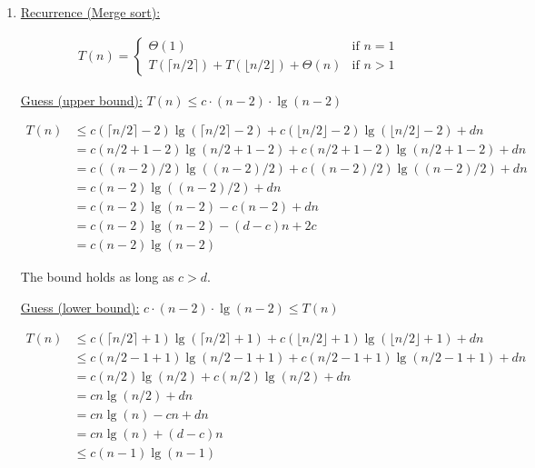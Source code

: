 \documentclass[12pt]{article}
\begin{document}
\begin{enumerate}[1.]
    \item
    \setcounter{equation}{0}
    \underline{Recurrence (Merge sort):}

    \begin{align*}
        T(n) =
        \begin{cases}
          \Theta(1) & \text{if $n = 1$}\\
          T(\lceil n/2 \rceil) + T(\lfloor n/2 \rfloor) + \Theta(n) & \text{if $n > 1$}
        \end{cases}
    \end{align*}

    \bigskip

    \underline{Guess (upper bound):} $T(n) \leq c \cdot (n-2) \cdot \lg (n-2)$

    \bigskip

    \begin{align}
        T(n) &\leq c(\lceil n/2 \rceil - 2) \lg (\lceil n/2 \rceil - 2) + c (\lfloor n/2 \rfloor - 2)\lg(\lfloor n/2 \rfloor - 2) + dn\\
        &= c(n/2 + 1 - 2) \lg (n/2 + 1 - 2) + c (n/2 + 1 - 2)\lg(n/2 + 1 - 2) + dn\\
        &= c((n-2)/2) \lg ((n-2)/2) + c ((n-2)/2)\lg((n-2)/2) + dn\\
        &= c(n-2) \lg ((n-2)/2) + dn\\
        &= c(n-2) \lg (n-2) - c(n-2) + dn\\
        &= c(n-2) \lg (n-2) - (d - c)n + 2c\\
        &= c(n-2) \lg (n-2)
    \end{align}

    \bigskip

    The bound holds as long as $c > d$.

    \bigskip

    \underline{Guess (lower bound):} $c \cdot (n-2) \cdot \lg (n-2) \leq T(n)$


    \bigskip

    \begin{align}
        T(n) &\leq c(\lceil n/2 \rceil + 1) \lg (\lceil n/2 \rceil + 1) + c (\lfloor n/2 \rfloor + 1)\lg(\lfloor n/2 \rfloor + 1) + dn\\
        &\leq c(n/2 - 1 + 1) \lg (n/2 - 1 + 1) + c (n/2 - 1 + 1)\lg(n/2 - 1 + 1) + dn\\
        &= c(n/2) \lg (n/2) + c (n/2)\lg(n/2) + dn\\
        &= cn \lg(n/2) + dn\\
        &= cn \lg(n) - cn + dn\\
        &= cn \lg(n) + (d - c)n\\
        &\leq c(n-1) \lg(n-1)
    \end{align}


\end{enumerate}
\end{document}
